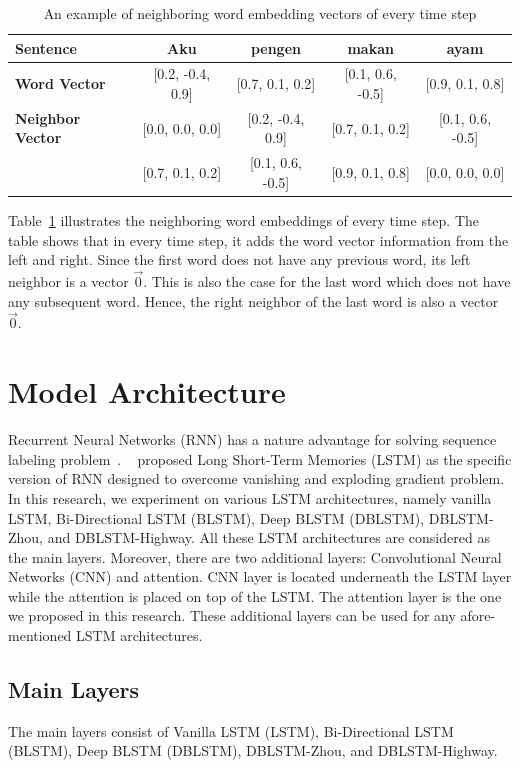 \begin{table}
	\centering
	\caption{An example of neighboring word embedding vectors of every time step}
	\label{tab:examplenwe}
	\begin{tabular}{|lcccc|}
		\hline
		\textbf{Sentence} 				& Aku & pengen & makan & ayam \\
		\hline
		\textbf{Word Vector}		& [0.2, -0.4, 0.9] & [0.7, 0.1, 0.2] & [0.1, 0.6, -0.5] & [0.9, 0.1, 0.8] \\			\textbf{Neighbor Vector}	& [0.0, 0.0, 0.0] & [0.2, -0.4, 0.9] & [0.7, 0.1, 0.2] & [0.1, 0.6, -0.5] \\
													& [0.7, 0.1, 0.2] & [0.1, 0.6, -0.5] &  [0.9, 0.1, 0.8] &  [0.0, 0.0, 0.0] \\
		\hline
	\end{tabular}
\end{table}

Table~\ref{tab:examplenwe} illustrates the neighboring word embeddings of every time step. The table shows that in every time step, it adds the word vector information from the left and right. Since the first word does not have any previous word, its left neighbor is a vector $\vec{0}$. This is also the case for the last word which does not have any subsequent word. Hence, the right neighbor of the last word is also a vector  $\vec{0}$.

\section{Model Architecture}
Recurrent Neural Networks (RNN) has a nature advantage for solving sequence labeling problem~\cite{zhou2015end}. ~\cite{hochreiter1997long} proposed Long Short-Term Memories (LSTM) as the specific version of RNN designed to overcome vanishing and exploding gradient problem. In this research, we experiment on various LSTM architectures, namely vanilla LSTM, Bi-Directional LSTM (BLSTM), Deep BLSTM (DBLSTM), DBLSTM-Zhou, and DBLSTM-Highway. All these LSTM architectures are considered as the main layers. Moreover, there are two additional layers: Convolutional Neural Networks (CNN) and attention. CNN layer is located underneath the LSTM layer while the attention is placed on top of the LSTM. The attention layer is the one we proposed in this research. These additional layers can be used for any afore-mentioned LSTM architectures.

\subsection{Main Layers}
The main layers consist of Vanilla LSTM (LSTM), Bi-Directional LSTM (BLSTM), Deep BLSTM (DBLSTM), DBLSTM-Zhou, and DBLSTM-Highway.

